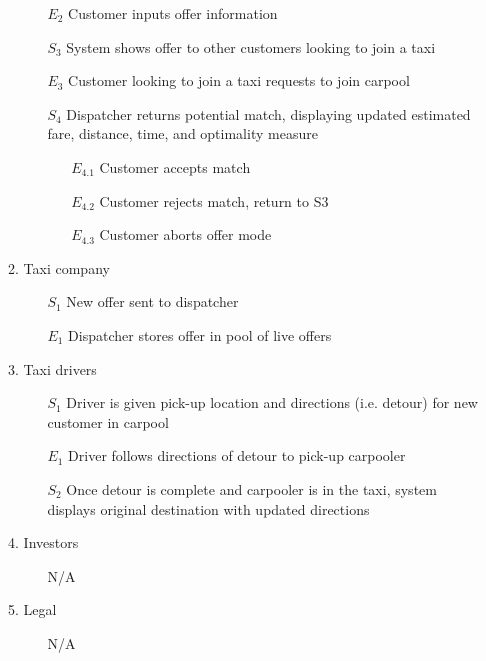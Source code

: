 \documentclass[]{article}
\begin{document}
\begin{enumerate}[{\textbf{BE}}1.]
\begin{enumerate}[{\textbf{VP5}}.1]
\begin{enumerate}
                \item[$E_2$] Customer inputs offer information
                \item[$S_3$] System shows offer to other customers looking to join a taxi
                \item[$E_3$] Customer looking to join a taxi requests to join carpool
                \item[$S_4$] Dispatcher returns potential match, displaying updated estimated fare, distance, time, and optimality measure
                \begin{enumerate}
                    \item[$E_{4.1}$] Customer accepts match
                    \item[$E_{4.2}$] Customer rejects match, return to S3
                    \item[$E_{4.3}$] Customer aborts offer mode
                \end{enumerate}
            \end{enumerate}
        \item Taxi company
            \begin{enumerate}
                \item[$S_1$] New offer sent to dispatcher
                \item[$E_1$] Dispatcher stores offer in pool of live offers
            \end{enumerate}
        \item Taxi drivers
            \begin{enumerate}
                \item[$S_1$] Driver is given pick-up location and directions (i.e. detour) for new customer in carpool
                \item[$E_1$] Driver follows directions of detour to pick-up carpooler
                \item[$S_2$] Once detour is complete and carpooler is in the taxi, system displays original destination with updated directions
            \end{enumerate}
        \item Investors
            \begin{enumerate}
                \item[N/A]
            \end{enumerate}
        \item Legal
            \begin{enumerate}
                \item[N/A]

\end{enumerate}
\end{enumerate}
\end{enumerate}
\end{document}
